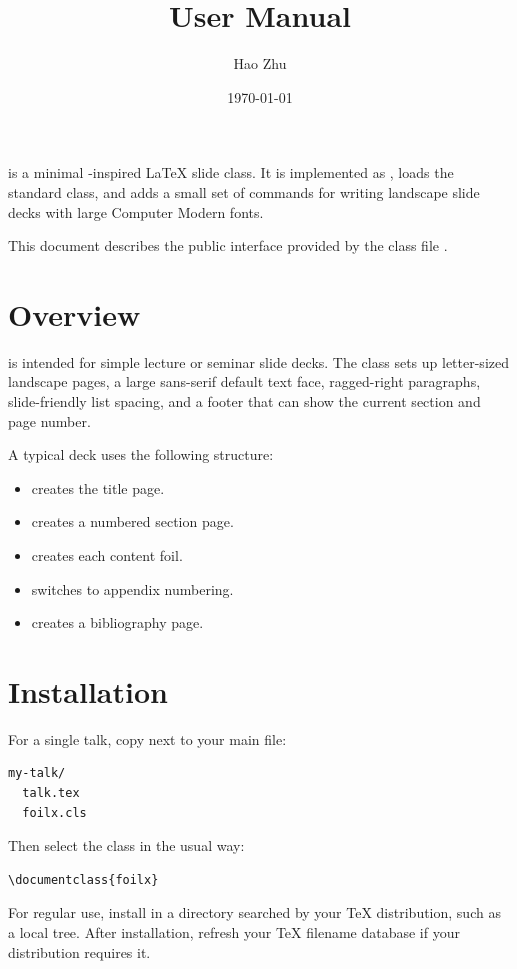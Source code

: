 \documentclass{article}
\title{\pkg{FoilX} User Manual}
\author{Hao Zhu}
\date{\today}
\begin{document}
\maketitle

 is a minimal -inspired LaTeX slide class.
It is implemented as , loads the standard  class, and adds a small set of commands for writing landscape slide decks with large Computer Modern fonts.

This document describes the public interface provided by the class file .

\section{Overview}
 is intended for simple lecture or seminar slide decks.
The class sets up letter-sized landscape pages, a large sans-serif default text face, ragged-right paragraphs, slide-friendly list spacing, and a footer that can show the current section and page number.

A typical deck uses the following structure:
\begin{itemize}
  \item {} creates the title page.
  \item {} creates a numbered section page.
  \item {} creates each content foil.
  \item {} switches to appendix numbering.
  \item {} creates a bibliography page.
\end{itemize}

\section{Installation}
For a single talk, copy  next to your main  file:
\begin{verbatim}
my-talk/
  talk.tex
  foilx.cls
\end{verbatim}

Then select the class in the usual way:
\begin{verbatim}
\documentclass{foilx}
\end{verbatim}

For regular use, install  in a directory searched by your TeX distribution, such as a local  tree.
After installation, refresh your TeX filename database if your distribution requires it.
\end{document}
